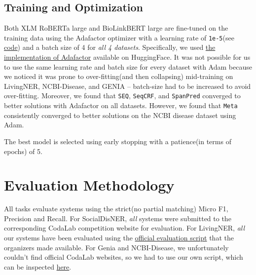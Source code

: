 \documentclass[11pt]{article}
\begin{document}
\subsection{Training and Optimization} 
Both XLM RoBERTa large\cite{xlm} and BioLinkBERT large\cite{yasunaga-etal-2022-linkbert} are fine-tuned on the training data using the Adafactor\cite{adafactor} optimizer with a learning rate of \verb|1e-5|(see \href{https://github.com/flyingmothman/bionlp/blob/d61b02593711b43b5d0f00f0c6ed62fb7685adf3/utils/training.py#L13-L20}{code}) and a batch size of 4 for \textit{all 4 datasets}. Specifically, we used \href{https://huggingface.co/docs/transformers/main_classes/optimizer_schedules#transformers.Adafactor}{the implementation of Adafactor} available on HuggingFace\cite{hugging}. It was not possible for us to use the same learning rate and batch size for every dataset with Adam\cite{adam} because we noticed it was prone to over-fitting(and then collapsing) mid-training on LivingNER, NCBI-Disease, and GENIA -- batch-size had to be increased to avoid over-fitting. Moreover, we found that \texttt{SEQ}, \texttt{SeqCRF}, and \texttt{SpanPred} converged to better solutions with Adafactor on all datasets. However, we found that \texttt{Meta} consistently converged to better solutions on the NCBI disease dataset using Adam. \par The best model is selected using early stopping with a patience(in terms of epochs) of 5. 

\section{Evaluation Methodology}
All tasks evaluate systems using the strict(no partial matching) Micro F1, Precision and Recall. For SocialDisNER, \textit{all} systems were submitted to the corresponding CodaLab\cite{pavao2022codalab} competition website for evaluation. For LivingNER, \textit{all} our systems have been evaluated using the \href{https://temu.bsc.es/livingner/2022/01/28/evaluation/}{official evaluation script} that the organizers made available. For Genia and NCBI-Disease, we unfortunately couldn't find official CodaLab websites, so we had to use our own script, which can be inspected \href{https://github.com/flyingmothman/bionlp}{here}.
\end{document}
